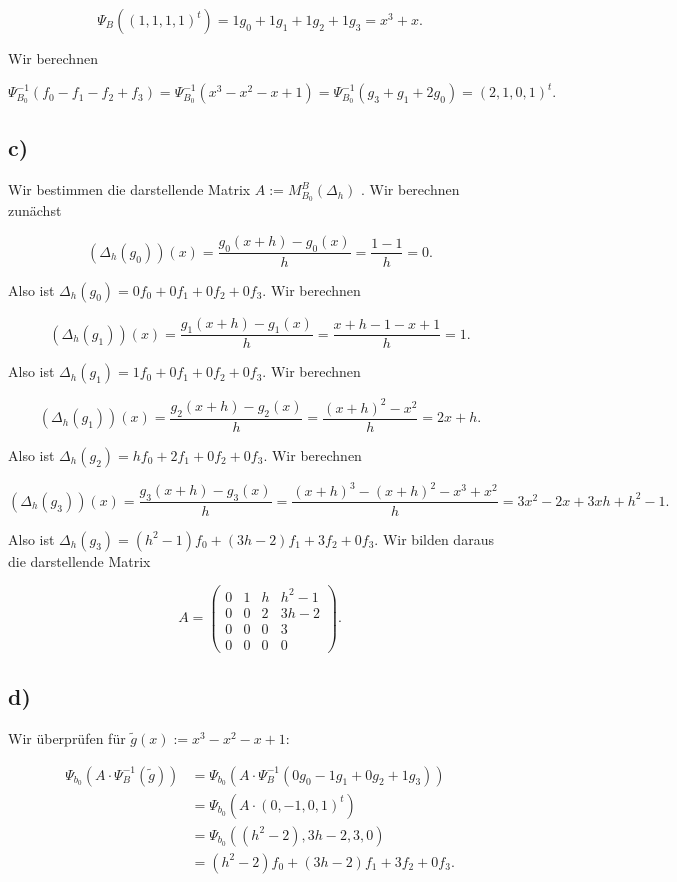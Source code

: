 \documentclass{article}
\begin{document}
\[
\Psi_B ((1,1,1,1)^t)
=
1 g_0 + 1 g_1 + 1 g_2 + 1 g_3
=
x^3 + x
.
\]

Wir berechnen

\[
\Psi_{B_0}^{-1}(f_0 - f_1 - f_2 + f_3)
=
\Psi_{B_0}^{-1}(x^3 - x^2 - x + 1)
=
\Psi_{B_0}^{-1}(g_3 + g_1 + 2 g_0)
=
(2,1,0,1)^t
.
\]

\newpage

\subsection*{c)}

Wir bestimmen die darstellende Matrix
$ A := M^B_{B_0}(\Delta_h) $
.
Wir berechnen zunächst

\[
\left( \Delta_h(g_0) \right)(x)
=
\frac{g_0(x + h) - g_0(x)}{h}
=
\frac{1 - 1}{h}
=
0.
\]

Also ist
$\Delta_h(g_0) = 0f_0 + 0f_1 + 0f_2 + 0f_3$.
Wir berechnen

\[
\left( \Delta_h(g_1) \right)(x)
=
\frac{g_1(x + h) - g_1(x)}{h}
=
\frac{x + h - 1 - x + 1}{h}
=
1.
\]

Also ist 
$ \Delta_h(g_1) = 1f_0 + 0f_1 + 0f_2 + 0f_3 $.
Wir berechnen

\[
\left( \Delta_h(g_1) \right)(x)
=
\frac{g_2(x + h) - g_2(x)}{h}
=
\frac{(x + h)^2 - x^2}{h}
=
2x + h.
\]

Also ist
$ \Delta_h(g_2) = hf_0 + 2f_1 + 0f_2 + 0f_3 $.
Wir berechnen

\[
\left( \Delta_h(g_3) \right)(x)
=
\frac{g_3(x + h) - g_3(x)}{h}
=
\frac{(x + h)^3 - (x + h)^2 - x^3 + x^2}{h}
=
3x^2 - 2x + 3xh + h^2 - 1.
\]

Also ist
$ \Delta_h(g_3) = (h^2 - 1)f_0 + (3h - 2)f_1 + 3f_2 + 0f_3 $.
Wir bilden daraus die darstellende Matrix

\[
A =
\begin{pmatrix}
 0 & 1 & h & h^2 - 1 \\
 0 & 0 & 2 & 3h - 2 \\
 0 & 0 & 0 & 3 \\
 0 & 0 & 0 & 0
\end{pmatrix}.
\]

\subsection*{d)}

Wir überprüfen für 
$ \tilde{g}(x) := x^3 - x^2 - x + 1 $:

\[
\begin{aligned}
    \Psi_{b_0}(A \cdot \Psi^{-1}_B(\tilde{g}))
     &= 
    \Psi_{b_0}(A \cdot \Psi^{-1}_B(0g_0 - 1g_1 + 0g_2 + 1g_3))
    \\ &= 
    \Psi_{b_0}(A \cdot (0, - 1,0,1)^t)
    \\ &= 
    \Psi_{b_0}((h^2 - 2),3h - 2,3,0)
    \\ &= 
    (h^2 - 2)f_0 + (3h - 2)f_1 + 3f_2 + 0f_3.
\end{aligned}
\]
\end{document}
